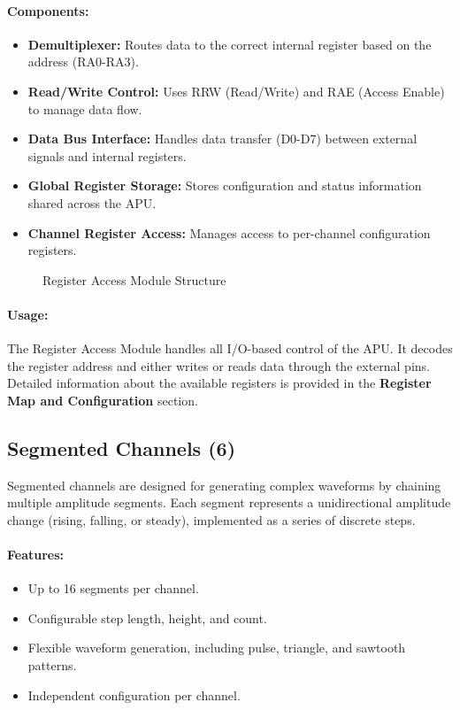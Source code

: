 \paragraph{Components:}
\begin{itemize}
    \item \textbf{Demultiplexer:} Routes data to the correct internal register based on the address (RA0-RA3).
    \item \textbf{Read/Write Control:} Uses RRW (Read/Write) and RAE (Access Enable) to manage data flow.
    \item \textbf{Data Bus Interface:} Handles data transfer (D0-D7) between external signals and internal registers.
    \item \textbf{Global Register Storage:} Stores configuration and status information shared across the APU.
    \item \textbf{Channel Register Access:} Manages access to per-channel configuration registers.
\end{itemize}

\begin{figure}[h!]
    \centering
    \caption{Register Access Module Structure}
\end{figure}

\paragraph{Usage:}
The Register Access Module handles all I/O-based control of the APU. It decodes the register address and either writes or reads data through the external pins. Detailed information about the available registers is provided in the \textbf{Register Map and Configuration} section.

\subsection{Segmented Channels (6)}
Segmented channels are designed for generating complex waveforms by chaining multiple amplitude segments. Each segment represents a unidirectional amplitude change (rising, falling, or steady), implemented as a series of discrete steps.

\paragraph{Features:}
\begin{itemize}
    \item Up to 16 segments per channel.
    \item Configurable step length, height, and count.
    \item Flexible waveform generation, including pulse, triangle, and sawtooth patterns.
    \item Independent configuration per channel.
\end{itemize}

